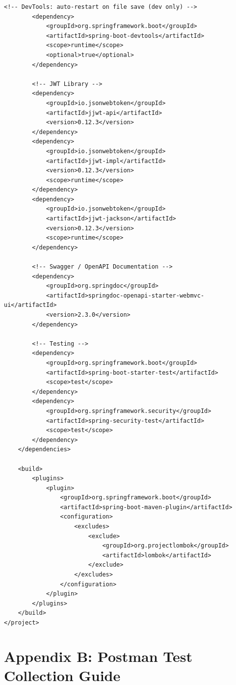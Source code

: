 \documentclass[12pt,a4paper]{report}
\begin{document}
\begin{lstlisting}[style=xmlstyle,caption=Complete pom.xml]
        <!-- DevTools: auto-restart on file save (dev only) -->
        <dependency>
            <groupId>org.springframework.boot</groupId>
            <artifactId>spring-boot-devtools</artifactId>
            <scope>runtime</scope>
            <optional>true</optional>
        </dependency>

        <!-- JWT Library -->
        <dependency>
            <groupId>io.jsonwebtoken</groupId>
            <artifactId>jjwt-api</artifactId>
            <version>0.12.3</version>
        </dependency>
        <dependency>
            <groupId>io.jsonwebtoken</groupId>
            <artifactId>jjwt-impl</artifactId>
            <version>0.12.3</version>
            <scope>runtime</scope>
        </dependency>
        <dependency>
            <groupId>io.jsonwebtoken</groupId>
            <artifactId>jjwt-jackson</artifactId>
            <version>0.12.3</version>
            <scope>runtime</scope>
        </dependency>

        <!-- Swagger / OpenAPI Documentation -->
        <dependency>
            <groupId>org.springdoc</groupId>
            <artifactId>springdoc-openapi-starter-webmvc-ui</artifactId>
            <version>2.3.0</version>
        </dependency>

        <!-- Testing -->
        <dependency>
            <groupId>org.springframework.boot</groupId>
            <artifactId>spring-boot-starter-test</artifactId>
            <scope>test</scope>
        </dependency>
        <dependency>
            <groupId>org.springframework.security</groupId>
            <artifactId>spring-security-test</artifactId>
            <scope>test</scope>
        </dependency>
    </dependencies>

    <build>
        <plugins>
            <plugin>
                <groupId>org.springframework.boot</groupId>
                <artifactId>spring-boot-maven-plugin</artifactId>
                <configuration>
                    <excludes>
                        <exclude>
                            <groupId>org.projectlombok</groupId>
                            <artifactId>lombok</artifactId>
                        </exclude>
                    </excludes>
                </configuration>
            </plugin>
        </plugins>
    </build>
</project>
\end{lstlisting}

\chapter{Appendix B: Postman Test Collection Guide}
\end{document}
